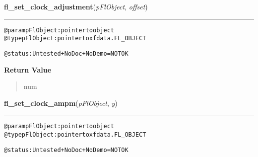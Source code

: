 \hspace{.8\funcindent}\begin{boxedminipage}{\funcwidth}

    \raggedright \textbf{fl\_set\_clock\_adjustment}(\textit{pFlObject}, \textit{offset})

    \vspace{-1.5ex}

    \rule{\textwidth}{0.5\fboxrule}
\setlength{\parskip}{2ex}
\begin{alltt}
@param pFlObject: pointer to object
@type pFlObject: pointer to xfdata.FL\_OBJECT

        @status: Untested + NoDoc + NoDemo = NOT OK
    
\end{alltt}

\setlength{\parskip}{1ex}
      \textbf{Return Value}
    \vspace{-1ex}

      \begin{quote}
      num

      \end{quote}

    \end{boxedminipage}

    \label{xformslib:flclock:fl_set_clock_ampm}

    \vspace{0.5ex}

\hspace{.8\funcindent}\begin{boxedminipage}{\funcwidth}

    \raggedright \textbf{fl\_set\_clock\_ampm}(\textit{pFlObject}, \textit{y})

    \vspace{-1.5ex}

    \rule{\textwidth}{0.5\fboxrule}
\setlength{\parskip}{2ex}
\begin{alltt}
        @param pFlObject: pointer to object
@type pFlObject: pointer to xfdata.FL\_OBJECT

        @status: Untested + NoDoc + NoDemo = NOT OK
    
\end{alltt}

\setlength{\parskip}{1ex}
    \end{boxedminipage}



